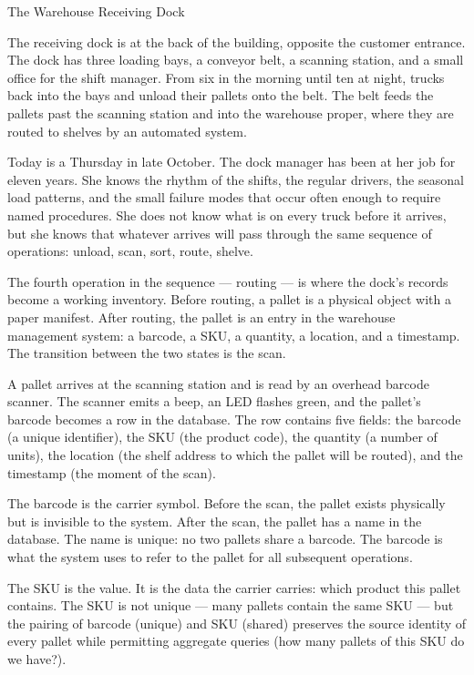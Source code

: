 \begin{coda}{The Warehouse Receiving Dock}

The receiving dock is at the back of the building, opposite the customer
entrance. The dock has three loading bays, a conveyor belt, a scanning
station, and a small office for the shift manager. From six in the morning
until ten at night, trucks back into the bays and unload their pallets
onto the belt. The belt feeds the pallets past the scanning station and
into the warehouse proper, where they are routed to shelves by an
automated system.

Today is a Thursday in late October. The dock manager has been at her job
for eleven years. She knows the rhythm of the shifts, the regular drivers,
the seasonal load patterns, and the small failure modes that occur often
enough to require named procedures. She does not know what is on every
truck before it arrives, but she knows that whatever arrives will pass
through the same sequence of operations: unload, scan, sort, route, shelve.

The fourth operation in the sequence --- routing --- is where the dock's
records become a working inventory. Before routing, a pallet is a physical
object with a paper manifest. After routing, the pallet is an entry in the
warehouse management system: a barcode, a SKU, a quantity, a location, and
a timestamp. The transition between the two states is the scan.

A pallet arrives at the scanning station and is read by an overhead
barcode scanner. The scanner emits a beep, an LED flashes green, and the
pallet's barcode becomes a row in the database. The row contains five
fields: the barcode (a unique identifier), the SKU (the product code), the
quantity (a number of units), the location (the shelf address to which
the pallet will be routed), and the timestamp (the moment of the scan).

The barcode is the carrier symbol. Before the scan, the pallet exists
physically but is invisible to the system. After the scan, the pallet has
a name in the database. The name is unique: no two pallets share a
barcode. The barcode is what the system uses to refer to the pallet for
all subsequent operations.

The SKU is the value. It is the data the carrier carries: which product
this pallet contains. The SKU is not unique --- many pallets contain the
same SKU --- but the pairing of barcode (unique) and SKU (shared)
preserves the source identity of every pallet while permitting aggregate
queries (how many pallets of this SKU do we have?).


\end{coda}
